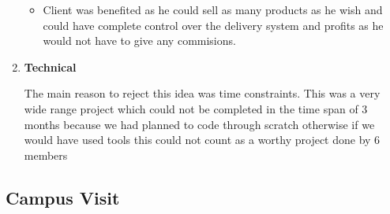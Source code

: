 \documentclass[fleqn,10pt]{../SelfArx} %
\begin{document}
\begin{enumerate}
\begin{itemize}
    \item Client was benefited as he could sell as many products as he wish and could have complete control over the delivery system and profits as he would not have to give any commisions.
\end{itemize}

\item \textbf{Technical}

The main reason to reject this idea was time constraints.
This was a very wide range project which could not be completed in the time span of 3 months because we had planned to code through scratch otherwise if we would have used tools this could not count as a worthy project done by 6 members
\end{enumerate}

\subsection{Campus Visit}
\vspace{0.5cm}
\end{document}
